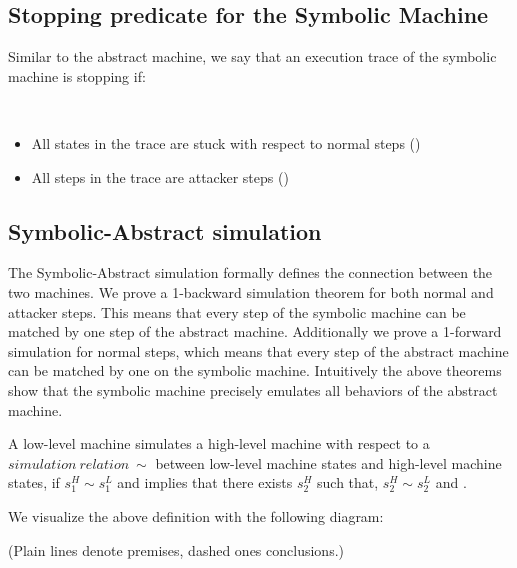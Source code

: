 \subsection{Stopping predicate for the Symbolic Machine}
\label{sec:symbolic_stopping}

Similar to the abstract machine, we say that an execution trace of the
symbolic machine is stopping if:

\begin{definition}
\label{symbolic_stopping}
~
\begin{itemize}
\item All states in the trace are stuck with respect to normal steps
  (\stepn{}{})
\item All steps in the trace are attacker steps (\stepa{}{}{})
\end{itemize}
\end{definition}

\subsection{Symbolic-Abstract  simulation}
\label{sec:refinement_SA}

The Symbolic-Abstract simulation formally defines the connection
between the two machines. We prove a 1-backward simulation theorem for
both normal and attacker steps. This means that every step of the
symbolic machine can be matched by one step of the abstract machine.
Additionally we prove a 1-forward simulation for normal steps,
which means that every step of the abstract machine can be matched
by one on the symbolic machine. Intuitively the above theorems show
that the symbolic machine precisely emulates all behaviors of
the abstract machine.

\begin{definition}
\label{simulation_LH}
  A low-level machine simulates a high-level machine with respect to a
  $simulation~relation~\sim$ between low-level machine states and
  high-level machine states, if $s^H_1 \sim s_1^L$ and
   implies that there exists $s^H_2$ such that,
  $s^H_2 \sim s^L_2$ and .

We visualize the above definition with the following diagram:

%
\vspace{-\smallskipamount}
 \begin{center}
  \end{center}
\vspace{-\smallskipamount}
(Plain lines denote premises, dashed ones conclusions.)
\end{definition}

